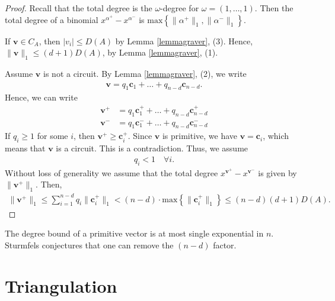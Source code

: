 \documentclass[a4paper, 11pt]{article}
\begin{document}
\begin{proof}
Recall that the total degree is the \( \omega \)-degree for \( \omega = (1, \dots, 1) \). Then the total degree of a binomial \( x^{\alpha^+} - x^{\alpha^-} \) is \( \mathrm{max}\left\{ 
  \|\alpha^+\|_1, \|\alpha^- \|_1
 \right\} \).

 If \( \mathbf v \in C_A \), then \( |v_i| \leq D(A) \) by Lemma \ref{lemmagraver}, (3). Hence, \( \| \mathbf v \|_1 \leq (d + 1) D(A) \), by Lemma \ref{lemmagraver}, (1).

 Assume \( \mathbf v  \) is not a circuit. By Lemma \ref{lemmagraver}, (2), we write 
 \begin{align*}
  \mathbf v = q_1 \mathbf c_1 +  \dots + q_{n - d}\mathbf c_{n-d}.
 \end{align*}
 Hence, we can write 
 \begin{align*}
  \mathbf v^+ &= q_1 \mathbf c_1^+ + \dots + q_{n-d}\mathbf c_{n-d}^+ \\
  \mathbf v^- &= q_1 \mathbf c_1^- + \dots + q_{n-d}\mathbf c_{n-d}^-
 \end{align*}
 If \( q_i \geq 1 \) for some \( i \), then \( \mathbf v^+ \geq \mathbf c_i^+ \). Since \( \mathbf v \) is primitive, we have \( \mathbf v = \mathbf c_i \), which means that \( \mathbf v \) is a circuit. This is a contradiction. Thus, we assume 
 \begin{align*}
  q_i < 1 \quad \forall i.
 \end{align*}
Without loss of generality we assume that the total degree \( x^{\mathbf v^+} - x^{\mathbf v^-} \) is given by \( \| \mathbf v^+ \|_1 \). Then,
\begin{align*}
  \| \mathbf v^+ \|_1 \leq \sum^{n-d}_{i=1} q_i \| \mathbf c_i^+ \|_1 < (n-d) \cdot \mathrm{max}\left\{ \| \mathbf c_i^+ \|_1 \right\} \leq (n-d)(d+1)D(A).
\end{align*}

\end{proof}

\begin{remark}
  The degree bound of a primitive vector is at most single exponential in \( n \). Sturmfels conjectures that one can remove the \( (n-d) \) factor.
\end{remark}





\clearpage
\section{Triangulation}
\end{document}
